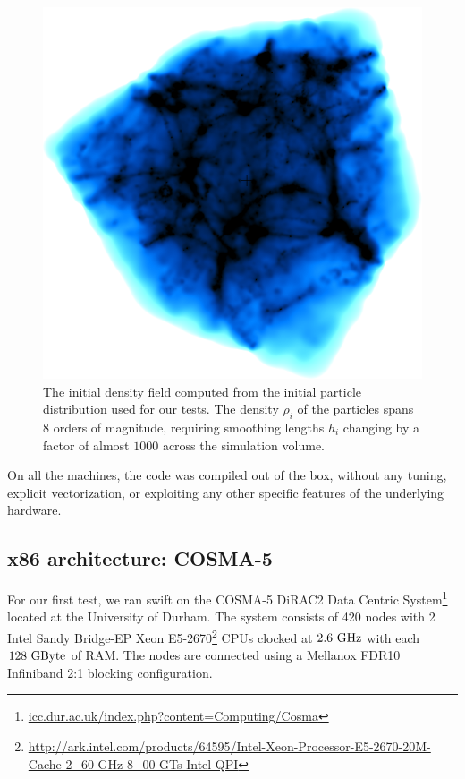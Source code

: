 \documentclass{sig-alternate-05-2015}
\newcommand{\swift}{{\sc swift}\xspace}
\begin{document}
\begin{figure}
\centering
\includegraphics[width=\columnwidth]{Figures/cosmoVolume}
\caption{The initial density field computed from the initial particle
  distribution used for our tests. The density $\rho_i$ of the particles spans 8
  orders of magnitude, requiring smoothing lengths $h_i$ changing by a factor of
  almost $1000$ across the simulation volume. \label{fig:ICs}}
\end{figure}  

On all the machines, the code was compiled out of the box,
without any tuning, explicit vectorization, or exploiting any
other specific features of the underlying hardware. 

\subsection{x86 architecture: COSMA-5}

For our first test, we ran \swift on the COSMA-5 DiRAC2 Data Centric
System\footnote{\url{icc.dur.ac.uk/index.php?content=Computing/Cosma}}
located at the University of Durham. The system consists of 420 nodes
with 2 Intel Sandy Bridge-EP Xeon
E5-2670\footnote{\url{http://ark.intel.com/products/64595/Intel-Xeon-Processor-E5-2670-20M-Cache-2_60-GHz-8_00-GTs-Intel-QPI}}
CPUs clocked at $2.6~\rm{GHz}$ with each $128~\rm{GByte}$ of RAM. The
nodes are connected using a Mellanox FDR10 Infiniband 2:1 blocking
configuration.
\end{document}
